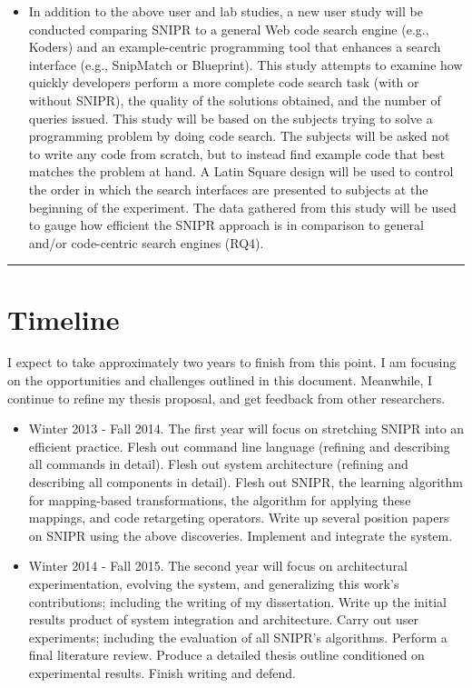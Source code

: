 \begin{itemize}
\item In addition to the above user and lab studies, a new user study will be conducted comparing \uppercase{SnipR} to a general Web code search engine (e.g., Koders) and an example-centric programming tool that enhances a search interface (e.g., SnipMatch or Blueprint). This study attempts to examine how quickly developers perform a more complete code search task (with or without \uppercase{SnipR}), the quality of the solutions obtained, and the number of queries issued. This study will be based on the subjects trying to solve a programming problem by doing code search. The subjects will be asked not to write any code from scratch, but to instead find example code that best matches the problem at hand. A Latin Square design will be used to control the order in which the search interfaces are presented to subjects at the beginning of the experiment. The data gathered from this study will be used to gauge how efficient the \uppercase{SnipR} approach is in comparison to general and/or code-centric search engines (RQ4).     
\end{itemize}

\fancybreak{\pfbreakdisplay}

\section{Timeline}
\label{sec:workplan}

I expect to take approximately two years to finish from this point. I am 
focusing on the opportunities and challenges outlined in this document. 
Meanwhile, I continue to refine my thesis proposal, and get feedback from other 
researchers. 

\begin{itemize}
\item Winter 2013 - Fall 2014. The first year will focus on stretching 
    \uppercase{SnipR} into an efficient practice.
    \subitem Flesh out command line language (refining and describing all 
    commands in detail).
    \subitem Flesh out system architecture (refining and describing all 
    components in detail).
    \subitem Flesh out \uppercase{SnipR}, the learning algorithm for mapping-based transformations,  
	 the algorithm for applying these mappings, and code retargeting operators.  
    \subitem Write up several position papers on \uppercase{SnipR} using the above discoveries.
    \subitem Implement and integrate the system.
\item Winter 2014 - Fall 2015. The second year will focus on architectural 
    experimentation, evolving the system, and generalizing this work's 
    contributions; including the writing of my dissertation.
    \subitem Write up the initial results product of system integration and 
    architecture.
    \subitem Carry out user experiments; including the evaluation of all \uppercase{SnipR}'s algorithms.
    \subitem Perform a final literature review. 
    \subitem Produce a detailed thesis outline conditioned on experimental 
    results.
    \subitem Finish writing and defend.
\end{itemize}

